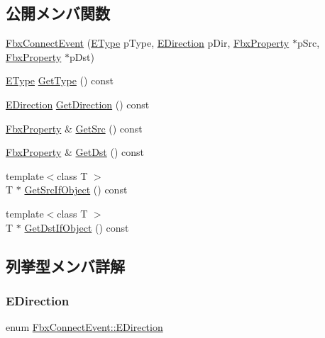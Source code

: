 \subsection*{公開メンバ関数}
\begin{DoxyCompactItemize}
\item 
\hyperlink{class_fbx_connect_event_a26c1e445ded5965f2e3a09643ab9b679}{Fbx\+Connect\+Event} (\hyperlink{class_fbx_connect_event_aa5471711f7e440a5a236ed06b08bf1d7}{E\+Type} p\+Type, \hyperlink{class_fbx_connect_event_a74f6cfad7f026059654d3bc6a582a78e}{E\+Direction} p\+Dir, \hyperlink{class_fbx_property}{Fbx\+Property} $\ast$p\+Src, \hyperlink{class_fbx_property}{Fbx\+Property} $\ast$p\+Dst)
\item 
\hyperlink{class_fbx_connect_event_aa5471711f7e440a5a236ed06b08bf1d7}{E\+Type} \hyperlink{class_fbx_connect_event_ac49976c7e8383896a63ff1e582e0ee2b}{Get\+Type} () const
\item 
\hyperlink{class_fbx_connect_event_a74f6cfad7f026059654d3bc6a582a78e}{E\+Direction} \hyperlink{class_fbx_connect_event_a0abc492bbba44390dbbba9d7dc9e0726}{Get\+Direction} () const
\item 
\hyperlink{class_fbx_property}{Fbx\+Property} \& \hyperlink{class_fbx_connect_event_adc2a02fd551701700f1d0921d7e96a73}{Get\+Src} () const
\item 
\hyperlink{class_fbx_property}{Fbx\+Property} \& \hyperlink{class_fbx_connect_event_a2b6176e2e3ce7e308909971b7534fd38}{Get\+Dst} () const
\item 
{\footnotesize template$<$class T $>$ }\\T $\ast$ \hyperlink{class_fbx_connect_event_a053adb5f16ff6d0e94e0511506070a38}{Get\+Src\+If\+Object} () const
\item 
{\footnotesize template$<$class T $>$ }\\T $\ast$ \hyperlink{class_fbx_connect_event_a7b52443ca2c001639f5776ee3540538a}{Get\+Dst\+If\+Object} () const
\end{DoxyCompactItemize}


\subsection{列挙型メンバ詳解}
\mbox{\label{class_fbx_connect_event_a74f6cfad7f026059654d3bc6a582a78e}} 
\subsubsection{\texorpdfstring{E\+Direction}{EDirection}}
{\footnotesize\ttfamily enum \hyperlink{class_fbx_connect_event_a74f6cfad7f026059654d3bc6a582a78e}{Fbx\+Connect\+Event\+::\+E\+Direction}}

